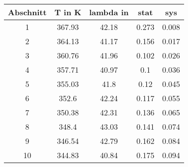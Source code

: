 \documentclass{article}
\begin{document}
\begin{tabular}{c|c|c|c|c}
Abschnitt&T in K&lambda in &stat&sys\\
\hline
1&367.93&42.18&0.273&0.008\\
2&364.13&41.17&0.156&0.017\\
3&360.76&41.96&0.102&0.026\\
4&357.71&40.97&0.1&0.036\\
5&355.03&41.8&0.12&0.045\\
6&352.6&42.24&0.117&0.055\\
7&350.38&42.31&0.136&0.065\\
8&348.4&43.03&0.141&0.074\\
9&346.54&42.79&0.162&0.084\\
10&344.83&40.84&0.175&0.094\\
\end{tabular}
\end{document}
